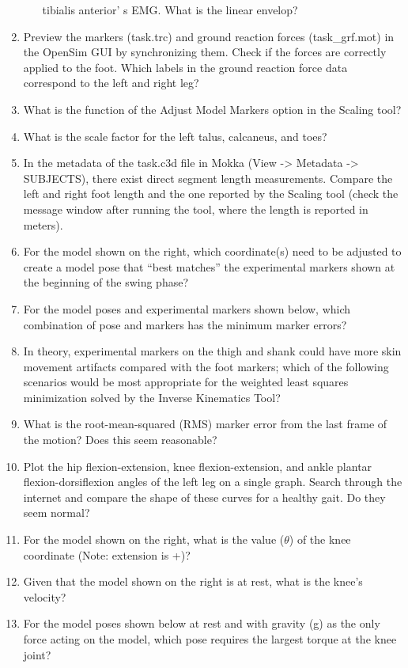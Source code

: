 \documentclass[11pt]{article}
\begin{document}
\begin{enumerate}
\begin{enumerate}
        tibialis anterior’ s EMG. What is the linear envelop?
    \end{enumerate}
    \item Preview the markers (task.trc) and ground reaction forces (task\_grf.mot) in the OpenSim GUI
    by synchronizing them. Check if the forces are correctly applied to the foot. Which labels in the ground reaction force data correspond to the left and right leg?
    \item What is the function of the Adjust Model Markers option in the Scaling tool?
    \item What is the scale factor for the left talus, calcaneus, and toes?
    \item In the metadata of the task.c3d file in Mokka (View -> Metadata -> SUBJECTS), there exist direct segment length measurements. Compare the left and right foot length and the one reported by the Scaling tool (check the message window after running the tool, where the length is reported in meters).
    \item For the model shown on the right, which coordinate(s) need to be adjusted to create a model pose that “best matches” the experimental markers shown at the beginning of the swing phase?
    \item For the model poses and experimental markers shown below, which combination of pose and markers has the minimum marker errors?
    \item In theory, experimental markers on the thigh and shank could have more skin movement artifacts compared with the foot markers; which of the following scenarios would be most appropriate for the weighted least squares minimization solved by the Inverse Kinematics Tool?
    \item What is the root-mean-squared (RMS) marker error from the last frame of the motion? Does this seem reasonable?
    \item Plot the hip flexion-extension, knee flexion-extension, and ankle plantar flexion-dorsiflexion angles of the left leg on a single graph. Search through the internet and compare the shape of these curves for a healthy gait. Do they seem normal?
    \item For the model shown on the right, what is the value ($\theta$) of the knee coordinate (Note: extension is +)?
    \item Given that the model shown on the right is at rest, what is the knee's velocity?
    \item For the model poses shown below at rest and with gravity (g) as the only force acting on the model, which pose requires the largest torque at the knee joint?

\end{enumerate}
\end{document}
